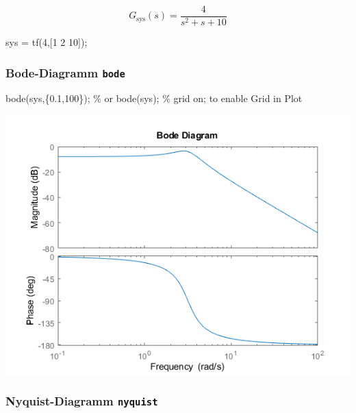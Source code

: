 \documentclass[
  10pt,
  a4paper,
  german]{article}
\newenvironment{Shaded}{}{}
\newcommand{\CommentTok}[1]{\textcolor[rgb]{0.42,0.45,0.49}{#1}}
\newcommand{\FloatTok}[1]{\textcolor[rgb]{0.00,0.36,0.77}{#1}}
\newcommand{\NormalTok}[1]{\textcolor[rgb]{0.14,0.16,0.18}{#1}}
\newcommand{\OperatorTok}[1]{\textcolor[rgb]{0.14,0.16,0.18}{#1}}
\newcommand{\VariableTok}[1]{\textcolor[rgb]{0.89,0.38,0.04}{#1}}
\numberwithin{equation}{section}
\begin{document}
\begin{multicols}{2}
\[
G_{\text{sys}}(s) = \frac{4}{s^2+s+10}
\]

\begin{Shaded}
\begin{Highlighting}[]
\VariableTok{sys} \OperatorTok{=} \VariableTok{tf}\NormalTok{(}\FloatTok{4}\OperatorTok{,}\NormalTok{[}\FloatTok{1} \FloatTok{2} \FloatTok{10}\NormalTok{])}\OperatorTok{;}
\end{Highlighting}
\end{Shaded}

\hypertarget{bode-diagramm-bode}{%
\subsubsection{\texorpdfstring{Bode-Diagramm
\texttt{bode}}{Bode-Diagramm bode}}\label{bode-diagramm-bode}}

\begin{Shaded}
\begin{Highlighting}[]
\VariableTok{bode}\NormalTok{(}\VariableTok{sys}\OperatorTok{,}\NormalTok{\{}\FloatTok{0.1}\OperatorTok{,}\FloatTok{100}\NormalTok{\})}\OperatorTok{;} \CommentTok{\% or bode(sys);}
\CommentTok{\% grid on; to enable Grid in Plot}
\end{Highlighting}
\end{Shaded}

\includegraphics{images/matlab_BodePlotResponse.png}

\hypertarget{nyquist-diagramm-nyquist}{%
\subsubsection{\texorpdfstring{Nyquist-Diagramm
\texttt{nyquist}}{Nyquist-Diagramm nyquist}}\label{nyquist-diagramm-nyquist}}


\end{multicols}
\end{document}
